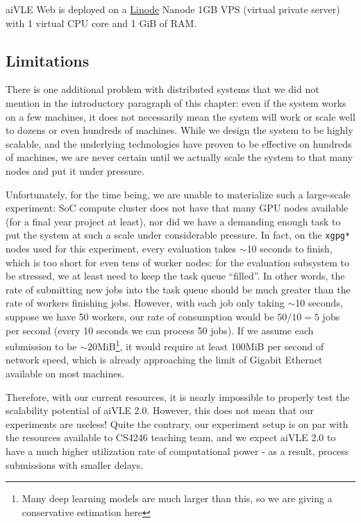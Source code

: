 aiVLE Web is deployed on a \href{https://linode.com/}{Linode} Nanode 1GB VPS (virtual private server) with 1 virtual CPU core and 1 GiB of RAM.

\subsection{Limitations}
\label{ss:deployment-limitations}
There is one additional problem with distributed systems that we did not mention in the introductory paragraph of this chapter: even if the system works on a few machines, it does not necessarily mean the system will work or scale well to dozens or even hundreds of machines. While we design the system to be highly scalable, and the underlying technologies have proven to be effective on hundreds of machines, we are never certain until we actually scale the system to that many nodes and put it under pressure.

Unfortunately, for the time being, we are unable to materialize such a large-scale experiment: SoC compute cluster does not have that many GPU nodes available (for a final year project at least), nor did we have a demanding enough task to put the system at such a scale under considerable pressure. In fact, on the \texttt{xgpg*} nodes used for this experiment, every evaluation takes $\sim$10 seconds to finish, which is too short for even tens of worker nodes: for the evaluation subsystem to be stressed, we at least need to keep the task queue ``filled''. In other words, the rate of submitting new jobs into the task queue should be much greater than the rate of workers finishing jobs. However, with each job only taking $\sim$10 seconds, suppose we have 50 workers, our rate of consumption would be $50/10=5$ jobs per second (every 10 seconds we can process 50 jobs). If we assume each submission to be $\sim$20MiB\footnote{Many deep learning models are much larger than this, so we are giving a conservative estimation here}, it would require at least 100MiB per second of network speed, which is already approaching the limit of Gigabit Ethernet available on most machines.

Therefore, with our current resources, it is nearly impossible to properly test the scalability potential of aiVLE 2.0. However, this does not mean that our experiments are useless! Quite the contrary, our experiment setup is on par with the resources available to CS4246 teaching team, and we expect aiVLE 2.0 to have a much higher utilization rate of computational power - as a result, process submissions with smaller delays.

